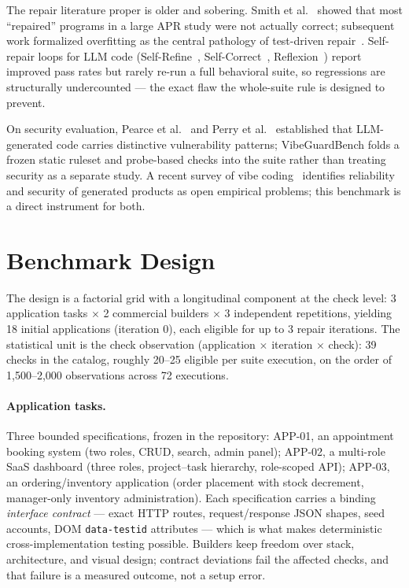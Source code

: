 \documentclass[conference]{IEEEtran}
\begin{document}
The repair literature proper is older and sobering. Smith et al.~\cite{smith2015cure}
showed that most ``repaired'' programs in a large APR study were not actually
correct; subsequent work formalized overfitting as the central pathology of
test-driven repair~\cite{petke2024patch, lou2024apr, ismayilzada2023poracle}.
Self-repair loops for LLM code (Self-Refine~\cite{madaan2023selfrefine},
Self-Correct~\cite{huang2023selfcorrect}, Reflexion~\cite{shinn2023reflexion})
report improved pass rates but rarely re-run a full behavioral suite, so
regressions are structurally undercounted --- the exact flaw the whole-suite rule
is designed to prevent.

On security evaluation, Pearce et al.~\cite{pearce2022asleep, pearce2023zeroshot}
and Perry et al.~\cite{perry2023insecure} established that LLM-generated code
carries distinctive vulnerability patterns; VibeGuardBench folds a frozen static
ruleset and probe-based checks into the suite rather than treating security as a
separate study. A recent survey of vibe coding~\cite{ge2025vibe} identifies
reliability and security of generated products as open empirical problems; this
benchmark is a direct instrument for both.

\section{Benchmark Design}
The design is a factorial grid with a longitudinal component at the check level:
3 application tasks $\times$ 2 commercial builders $\times$ 3 independent
repetitions, yielding 18 initial applications (iteration 0), each eligible for up
to 3 repair iterations. The statistical unit is the check observation
(application $\times$ iteration $\times$ check): 39 checks in the catalog,
roughly 20--25 eligible per suite execution, on the order of 1,500--2,000
observations across 72 executions.

\paragraph{Application tasks.} Three bounded specifications, frozen in the
repository: APP-01, an appointment booking system (two roles, CRUD, search, admin
panel); APP-02, a multi-role SaaS dashboard (three roles, project--task
hierarchy, role-scoped API); APP-03, an ordering/inventory application (order
placement with stock decrement, manager-only inventory administration). Each
specification carries a binding \emph{interface contract} --- exact HTTP routes,
request/response JSON shapes, seed accounts, DOM \texttt{data-testid} attributes
--- which is what makes deterministic cross-implementation testing possible.
Builders keep freedom over stack, architecture, and visual design; contract
deviations fail the affected checks, and that failure is a measured outcome, not
a setup error.
\end{document}
